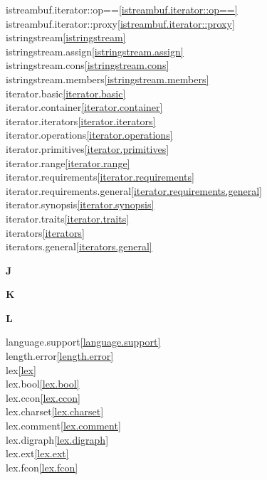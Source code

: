 \begin{multicols}{2}
istreambuf.iterator::op==\quad\ref{istreambuf.iterator::op==}\\
istreambuf.iterator::proxy\quad\ref{istreambuf.iterator::proxy}\\
istringstream\quad\ref{istringstream}\\
istringstream.assign\quad\ref{istringstream.assign}\\
istringstream.cons\quad\ref{istringstream.cons}\\
istringstream.members\quad\ref{istringstream.members}\\
iterator.basic\quad\ref{iterator.basic}\\
iterator.container\quad\ref{iterator.container}\\
iterator.iterators\quad\ref{iterator.iterators}\\
iterator.operations\quad\ref{iterator.operations}\\
iterator.primitives\quad\ref{iterator.primitives}\\
iterator.range\quad\ref{iterator.range}\\
iterator.requirements\quad\ref{iterator.requirements}\\
iterator.requirements.general\quad\ref{iterator.requirements.general}\\
iterator.synopsis\quad\ref{iterator.synopsis}\\
iterator.traits\quad\ref{iterator.traits}\\
iterators\quad\ref{iterators}\\
iterators.general\quad\ref{iterators.general}\\
\par \textbf{J}\par
\par \textbf{K}\par
\par \textbf{L}\par
language.support\quad\ref{language.support}\\
length.error\quad\ref{length.error}\\
lex\quad\ref{lex}\\
lex.bool\quad\ref{lex.bool}\\
lex.ccon\quad\ref{lex.ccon}\\
lex.charset\quad\ref{lex.charset}\\
lex.comment\quad\ref{lex.comment}\\
lex.digraph\quad\ref{lex.digraph}\\
lex.ext\quad\ref{lex.ext}\\
lex.fcon\quad\ref{lex.fcon}\\

\end{multicols}
